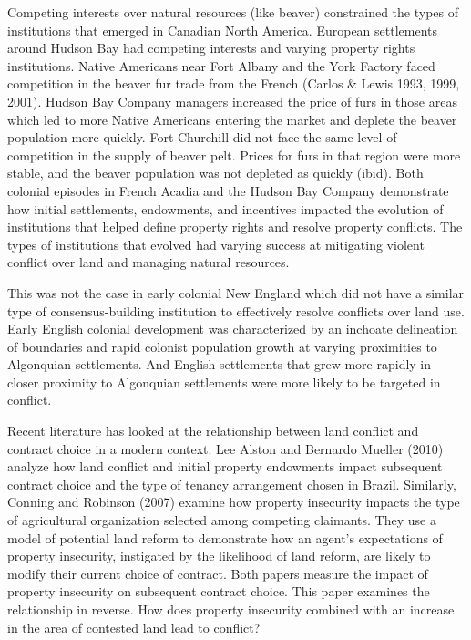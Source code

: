 \documentclass[sn-mathphys]{sn-jnl}%
\theoremstyle{thmstyleone}%
\theoremstyle{thmstyletwo}%
\theoremstyle{thmstylethree}%
\begin{document}
Competing interests over natural resources (like beaver) constrained the types of institutions that emerged in Canadian North America. European settlements around Hudson Bay had competing interests and varying property rights institutions. Native Americans near Fort Albany and the York Factory faced competition in the beaver fur trade from the French (Carlos \& Lewis 1993, 1999, 2001). Hudson Bay Company managers increased the price of furs in those areas which led to more Native Americans entering the market and deplete the beaver population more quickly. Fort Churchill did not face the same level of competition in the supply of beaver pelt. Prices for furs in that region were more stable, and the beaver population was not depleted as quickly (ibid). Both colonial episodes in French Acadia and the Hudson Bay Company demonstrate how initial settlements, endowments, and incentives impacted the evolution of institutions that helped define property rights and resolve property conflicts. The types of institutions that evolved had varying success at mitigating violent conflict over land and managing natural resources. 

This was not the case in early colonial New England which did not have a similar type of consensus-building institution to effectively resolve conflicts over land use. Early English colonial development was characterized by an inchoate delineation of boundaries and rapid colonist population growth at varying proximities to Algonquian settlements. And English settlements that grew more rapidly in closer proximity to Algonquian settlements were more likely to be targeted in conflict.

Recent literature has looked at the relationship between land conflict and contract choice in a modern context. %
Lee Alston and Bernardo Mueller (2010) analyze how land conflict and initial property endowments impact subsequent contract choice and the type of tenancy arrangement chosen in Brazil. Similarly, Conning and Robinson (2007) examine how property insecurity impacts the type of agricultural organization selected among competing claimants. They use a model of potential land reform to demonstrate how an agent's expectations of property insecurity, instigated by the likelihood of land reform, are likely to modify their current choice of contract. Both papers measure the impact of property insecurity on subsequent contract choice. This paper examines the relationship in reverse. How does property insecurity combined with an increase in the area of contested land lead to conflict?
\end{document}
